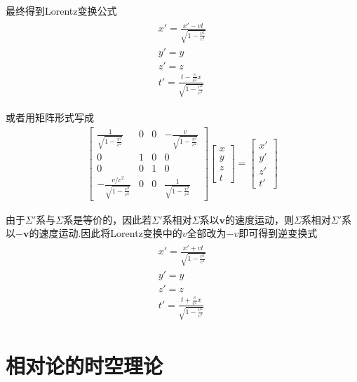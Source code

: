 \documentclass[main.tex]{subfiles}
\begin{document}
最终得到Lorentz变换公式
\begin{align}
    \label{Lorentzbianhuan}\begin{array}{c}
    x' = \frac{\displaystyle x' - vt}{\displaystyle \sqrt{1-\frac{v^2}{c^2}}}\\
    y' = y\\
    z' = z\\
    t' = \frac{\displaystyle t - \frac{v}{c^2}x}{\displaystyle \sqrt{1- \frac{v^2}{c^2}}}
    \end{array}
\end{align}

或者用矩阵形式写成
\begin{align}
    \label{Lorentzjuzhen}\begin{bmatrix}
  \frac{1}{\sqrt{1-\frac{v^2}{c^2} } } & 0 & 0 & -\frac{v}{\sqrt{1-\frac{v^2}{c^2}}} \\
  0& 1 & 0 &0 \\
 0 & 0 & 1 & 0\\
  -\frac{v/c^2}{\sqrt{1-\frac{v^2}{c^2}}} & 0 & 0 &\frac{1}{\sqrt{1-\frac{v^2}{c^2}}} 
\end{bmatrix}
\begin{bmatrix}
 x\\
 y\\
 z\\
t
\end{bmatrix}
=
\begin{bmatrix}
 x'\\
 y'\\
 z'\\
t'
\end{bmatrix}
\end{align}

由于$\Sigma '$系与$\Sigma $系是等价的，因此若$\Sigma '$系相对$\Sigma $系以$\boldsymbol{v}$的速度运动，则$\Sigma $系相对$\Sigma '$系以$-\boldsymbol{v}$的速度运动.因此将Lorentz变换中的$v$全部改为$-v$即可得到逆变换式
\begin{align}
    \begin{array}{c}
    x' = \frac{\displaystyle x' + vt}{\displaystyle \sqrt{1-\frac{v^2}{c^2}}}\\
    y' = y\\
    z' = z\\
    t' = \frac{\displaystyle t + \frac{v}{c^2}x}{\displaystyle \sqrt{1- \frac{v^2}{c^2}}}
    \end{array}
\end{align}

\section{相对论的时空理论}
\end{document}
